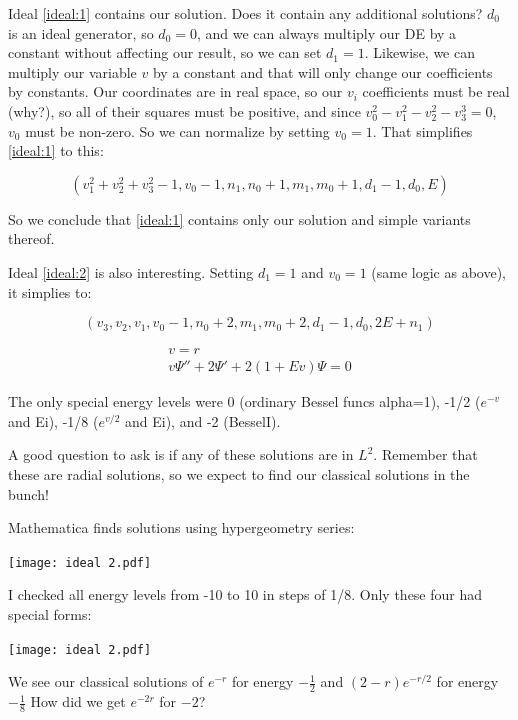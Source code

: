 \documentclass{article}
\begin{document}
Ideal \eqref{ideal:1} contains our solution.  Does it contain any additional solutions?  $d_0$ is an ideal generator,
so $d_0=0$, and we can always multiply our DE by a constant without affecting our result, so we can set $d_1=1$.
Likewise, we can multiply our variable $v$ by a constant and that will only change our coefficients by constants.
Our coordinates are in real space, so our $v_i$ coefficients must be real (why?), so all of their squares must
be positive, and since $v_0^2-v_1^2-v_2^2-v_3^3=0$, $v_0$ must be non-zero.  So we can normalize by setting $v_0=1$.
That simplifies \eqref{ideal:1} to this:

\begin{equation}
\left(v_{1}^{2} + v_{2}^{2} + v_{3}^{2} - 1, v_{0} - 1, n_{1}, n_{0} + 1, m_{1}, m_{0} + 1, d_{1} - 1, d_{0}, E\right)
\end{equation}

So we conclude that \eqref{ideal:1} contains only our solution and simple variants thereof.

Ideal \eqref{ideal:2} is also interesting.  Setting $d_1=1$ and $v_0=1$ (same logic as above), it simplies to:

\begin{equation}
\left(v_{3}, v_{2}, v_{1}, v_{0} - 1, n_{0} + 2, m_{1}, m_{0} + 2, d_{1} - 1, d_{0}, 2 E + n_{1}\right)
\end{equation}

\begin{equation}
\begin{gathered}
v=r \\
v \Psi'' + 2 \Psi' + 2(1 + E v) \Psi = 0
\end{gathered}
\end{equation}

The only special energy levels were 0 (ordinary Bessel funcs alpha=1), -1/2 ($e^{-v}$ and Ei), -1/8 ($e^{v/2}$ and Ei), and -2 (BesselI).

A good question to ask is if any of these solutions are in $L^2$.  Remember that these are radial solutions,
so we expect to find our classical solutions in the bunch!

Mathematica finds solutions using hypergeometry series:

\texttt{[image: ideal 2.pdf]}

I checked all energy levels from -10 to 10 in steps of 1/8.  Only these four had special forms:

\texttt{[image: ideal 2.pdf]}

We see our classical solutions of $e^{-r}$ for energy $-\frac{1}{2}$ and $(2-r)e^{-r/2}$
for energy $-\frac{1}{8}$  How did we get $e^{-2r}$ for $-2$?
\end{document}
